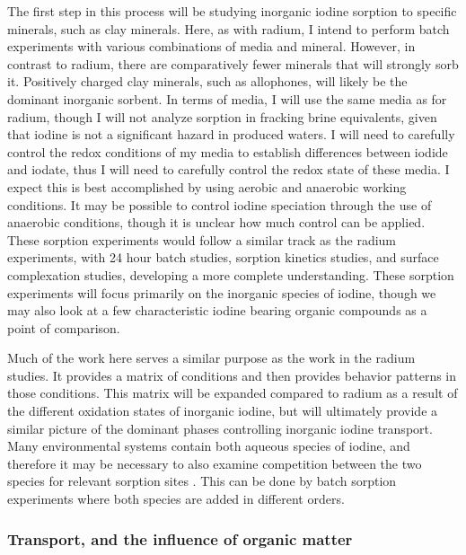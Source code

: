 \documentclass[twoside,12pt,titlepage]{article}
\begin{document}
The first step in this process will be studying inorganic iodine sorption to specific minerals, such as clay minerals. Here, as with radium, I intend to perform batch experiments with various combinations of media and mineral. However, in contrast to radium, there are comparatively fewer minerals that will strongly sorb it. Positively charged clay minerals, such as allophones, will likely be the dominant inorganic sorbent. In terms of media, I will use the same media as for radium, though I will not analyze sorption in fracking brine equivalents, given that iodine is not a significant hazard in produced waters. I will need to carefully control the redox conditions of my media to establish differences between iodide and iodate, thus I will need to carefully control the redox state of these media. I expect this is best accomplished by using aerobic and anaerobic working conditions. It may be possible to control iodine speciation through the use of anaerobic conditions, though it is unclear how much control can be applied. These sorption experiments would follow a similar track as the radium experiments, with 24 hour batch studies, sorption kinetics studies, and surface complexation studies, developing a more complete understanding. These sorption experiments will focus primarily on the inorganic species of iodine, though we may also look at a few characteristic iodine bearing organic compounds as a point of comparison. 
\par Much of the work here serves a similar purpose as the work in the radium studies. It provides a matrix of conditions and then provides behavior patterns in those conditions. This matrix will be expanded compared to radium as a result of the different oxidation states of inorganic iodine, but will ultimately provide a similar picture of the dominant phases controlling inorganic iodine transport. Many environmental systems contain both aqueous species of iodine, and therefore it may be necessary to also examine competition between the two species for relevant sorption sites \cite{Gilfedder2010}. This can be done by batch sorption experiments where both species are added in different orders.


\subsubsection{Transport, and the influence of organic matter}
\end{document}
